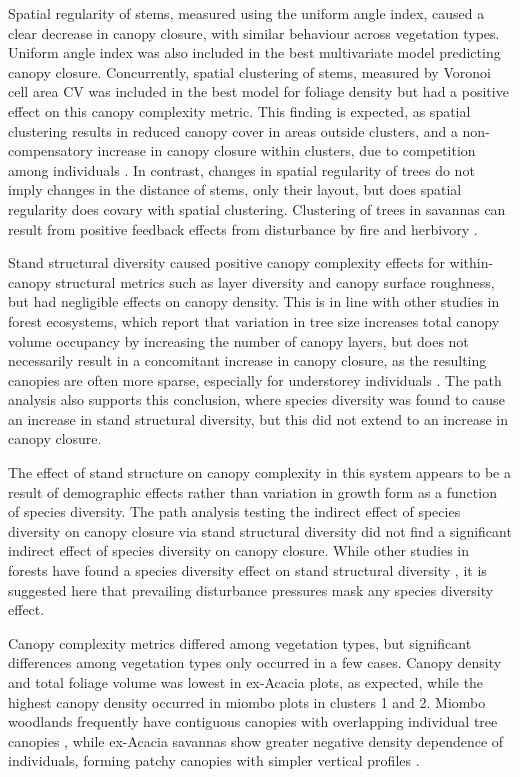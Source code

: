 \documentclass[11pt,a4paper]{article}
\begin{document}
Spatial regularity of stems, measured using the uniform angle index, caused a clear decrease in canopy closure, with similar behaviour across vegetation types. Uniform angle index was also included in the best multivariate model predicting canopy closure. Concurrently, spatial clustering of stems, measured by Voronoi cell area CV was included in the best model for foliage density but had a positive effect on this canopy complexity metric. This finding is expected, as spatial clustering results in reduced canopy cover in areas outside clusters, and a non-compensatory increase in canopy closure within clusters, due to competition among individuals \citep{}. In contrast, changes in spatial regularity of trees do not imply changes in the distance of stems, only their layout, but does spatial regularity does covary with spatial clustering. Clustering of trees in savannas can result from positive feedback effects from disturbance by fire and herbivory \citep{}. 

Stand structural diversity caused positive canopy complexity effects for within-canopy structural metrics such as layer diversity and canopy surface roughness, but had negligible effects on canopy density. This is in line with other studies in forest ecosystems, which report that variation in tree size increases total canopy volume occupancy by increasing the number of canopy layers, but does not necessarily result in a concomitant increase in canopy closure, as the resulting canopies are often more sparse, especially for understorey individuals \citep{}. The path analysis also supports this conclusion, where species diversity was found to cause an increase in stand structural diversity, but this did not extend to an increase in canopy closure. 

The effect of stand structure on canopy complexity in this system appears to be a result of demographic effects rather than variation in growth form as a function of species diversity. The path analysis testing the indirect effect of species diversity on canopy closure via stand structural diversity did not find a significant indirect effect of species diversity on canopy closure. While other studies in forests have found a species diversity effect on stand structural diversity \citep{}, it is suggested here that prevailing disturbance pressures mask any species diversity effect.

Canopy complexity metrics differed among vegetation types, but significant differences among vegetation types only occurred in a few cases. Canopy density and total foliage volume was lowest in ex-Acacia plots, as expected, while the highest canopy density occurred in miombo plots in clusters 1 and 2. Miombo woodlands frequently have contiguous canopies with overlapping individual tree canopies \citep{}, while ex-Acacia savannas show greater negative density dependence of individuals, forming patchy canopies with simpler vertical profiles \citep{}.  
\end{document}

